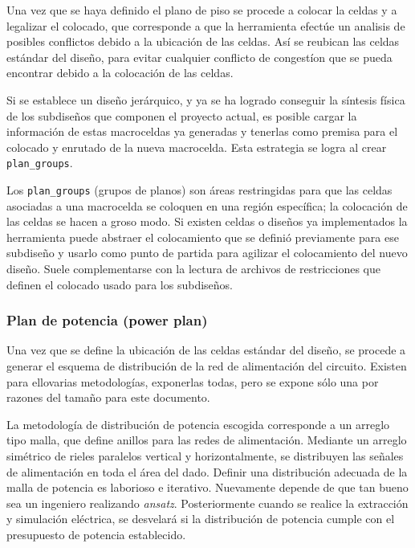 Una vez que se haya definido el plano de piso se procede a colocar la celdas y a legalizar el colocado, que corresponde a que la herramienta efectúe un analisis de posibles conflictos debido a la ubicación de las celdas. Así se reubican las celdas estándar del diseño, para evitar cualquier conflicto de congestíon que se pueda encontrar debido a la colocación de las celdas.

Si se establece un diseño jerárquico, y ya se ha logrado conseguir la síntesis física de los subdiseños que componen el proyecto actual, es posible cargar la información de estas macroceldas ya generadas y tenerlas como premisa para el colocado y enrutado de la nueva macrocelda. Esta estrategia se logra al crear \texttt{plan\_groups}.

Los \texttt{plan\_groups} (grupos de planos) son áreas restringidas para que las celdas asociadas a una macrocelda se coloquen en una región específica; la colocación de las celdas se hacen a groso modo. Si existen celdas o diseños ya implementados la herramienta puede abstraer el colocamiento que se definió previamente para ese subdiseño y usarlo como punto de partida para agilizar el colocamiento del nuevo diseño. Suele complementarse con la lectura de archivos de restricciones que definen el colocado usado para los subdiseños.

\subsubsection{Plan de potencia (power plan)}

Una vez que se define la ubicación de las celdas estándar del diseño, se procede a generar el esquema de distribución de la red de alimentación del circuito. Existen para ellovarias metodologías, exponerlas todas, pero se expone sólo una por razones del tamaño para este documento.

La metodología de distribución de potencia escogida corresponde a un arreglo tipo malla, que define anillos para las redes de alimentación. Mediante un arreglo simétrico de rieles paralelos vertical y horizontalmente, se distribuyen las señales de alimentación en toda el área del dado. Definir una distribución adecuada de la malla de potencia es laborioso e iterativo. Nuevamente depende de que tan bueno sea un ingeniero realizando \textit{ansatz}. Posteriormente cuando se realice la extracción y simulación eléctrica, se desvelará si la distribución de potencia cumple con el presupuesto de potencia establecido.


